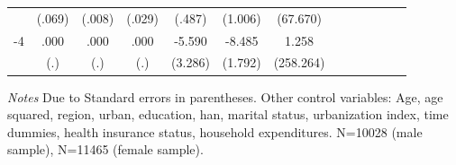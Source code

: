\begin{table}[h]
\begin{adjustbox}{max width=\linewidth}
\begin{threeparttable}
{\begin{tabular}{l*{6}{SS}}
                &   (.069)         &   (.008)         &   (.029)         &   (.487)         &  (1.006)         & (67.670)         \\
-4             &     .000         &     .000         &     .000         &   -5.590\sym{*}  &   -8.485\sym{***}&    1.258         \\
                &      (.)         &      (.)         &      (.)         &  (3.286)         &  (1.792)         &(258.264)         \\      
\bottomrule
\end{tabular}
\begin{tablenotes}
\item \textit{Notes} Due to    Standard errors in parentheses.
Other control variables: Age, age squared, region, urban, education, han, marital status, urbanization index, time dummies, health insurance status, household expenditures.    N=10028 (male sample), N=11465 (female sample).
\end{tablenotes}
}
\end{threeparttable}
\end{adjustbox}
\end{table}




